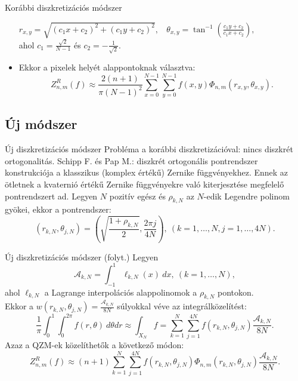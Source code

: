\documentclass{beamer}
\begin{document}
\begin{frame}{Korábbi diszkretizációs módszer}
\begin{itemize}
                $r_{x,y} = \sqrt{(c_1x + c_2)^2 + (c_1y + c_2)^2},\ \ \ \  \theta_{x,y} = \tan^{-1}\left(\frac{c_1y + c_2}{c_1x + c_2}\right),$\\
                ahol $c_1 = \frac{\sqrt{2}}{N-1}$ és $c_2 = -\frac{1}{\sqrt{2}}$.
          \item Ekkor a pixelek helyét alappontoknak választva:\\
                $$Z^R_{n,m}(f) \approx \frac{2(n+1)}{\pi(N-1)^2}\sum_{x=0}^{N-1}\sum_{y=0}^{N-1}f(x,y)\Phi_{n,m}(r_{x,y},\theta_{x,y}).$$
      \end{itemize}
\end{frame}

\subsection{Új módszer}
\begin{frame}{Új diszkretizációs módszer}
    Probléma a korábbi diszkretizációval: nincs diszkrét ortogonalitás.
    \vskip 5mm
    Schipp F. és Pap M.: diszkrét ortogonális pontrendszer konstrukciója a klasszikus (komplex értékű) Zernike függvényekhez.
    \vskip 3mm
    Ennek az ötletnek a kvaternió értékű Zernike függvényekre való kiterjesztése megfelelő pontrendszert ad.
    \vskip 3mm
    Legyen $N$ pozitív egész és $\rho_{k,N}$ az $N$-edik Legendre polinom gyökei, ekkor a pontrendszer:
    $$(r_{k,N}, \theta_{j,N}) = \left(\sqrt{\frac{1+\rho_{k,N}}{2}} , \frac{2\pi j}{4N} \right), \ (k=1,\ldots,N,j=1,\ldots,4N).$$
    
\end{frame}

\begin{frame}{Új diszkretizációs módszer (folyt.)}
    \vskip 5mm
    Legyen $$\mathcal{A}_{k,N} = \int_{-1}^{1} \ell_{k,N}(x)\ dx, \ (k=1,\ldots,N),$$ ahol $\ell_{k,N}$ a Lagrange interpolációs alappolinomok a $\rho_{k,N}$ pontokon.\\
    Ekkor a $w(r_{k,N},\theta_{j,N}) = \frac{\mathcal{A}_{k,N}}{8N}$ súlyokkal véve az integrálközelítést:
    $$\frac{1}{\pi} \int_{0}^1 \int_0^{2\pi} f(r,\theta)\ d\theta dr \approx \int_{X_N} f = \sum_{k=1}^{N} \sum_{j=1}^{4N} f(r_{k,N},\theta_{j,N}) \frac{\mathcal{A}_{k,N}}{8N}.$$
    Azaz a QZM-ek közelíthetők a következő módon:
    $$Z^R_{n,m}(f) \approx (n+1)\sum_{k=1}^{N}\sum_{j=1}^{4N}f(r_{k,N},\theta_{j,N})\Phi_{n,m}(r_{k,N},\theta_{j,N})\frac{\mathcal{A}_{k,N}}{8N}.$$

\end{frame}
\end{document}
